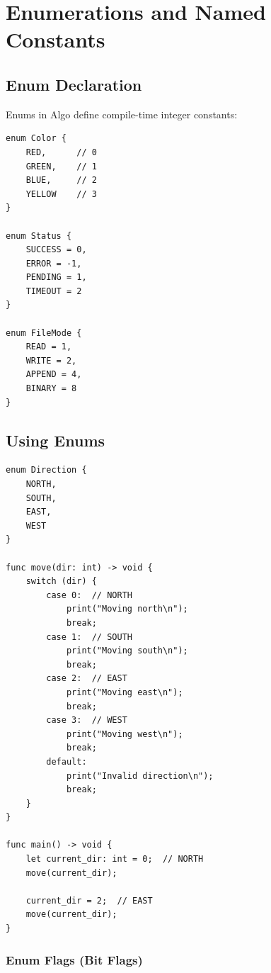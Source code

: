 \documentclass[12pt,a4paper,oneside]{book}
\begin{document}
\chapter{Enumerations and Named Constants}

\section{Enum Declaration}

Enums in Algo define compile-time integer constants:

\begin{lstlisting}[style=algo, caption={Enum Syntax}]
enum Color {
    RED,      // 0
    GREEN,    // 1
    BLUE,     // 2
    YELLOW    // 3
}

enum Status {
    SUCCESS = 0,
    ERROR = -1,
    PENDING = 1,
    TIMEOUT = 2
}

enum FileMode {
    READ = 1,
    WRITE = 2,
    APPEND = 4,
    BINARY = 8
}
\end{lstlisting}

\section{Using Enums}

\begin{lstlisting}[style=algo, caption={Enum Usage Examples}]
enum Direction {
    NORTH,
    SOUTH,
    EAST,
    WEST
}

func move(dir: int) -> void {
    switch (dir) {
        case 0:  // NORTH
            print("Moving north\n");
            break;
        case 1:  // SOUTH
            print("Moving south\n");
            break;
        case 2:  // EAST
            print("Moving east\n");
            break;
        case 3:  // WEST
            print("Moving west\n");
            break;
        default:
            print("Invalid direction\n");
            break;
    }
}

func main() -> void {
    let current_dir: int = 0;  // NORTH
    move(current_dir);
    
    current_dir = 2;  // EAST
    move(current_dir);
}
\end{lstlisting}

\subsection{Enum Flags (Bit Flags)}
\end{document}
